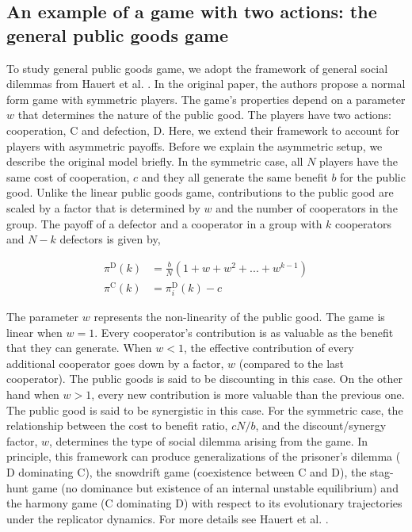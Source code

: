 \documentclass[11pt]{article}
\theoremstyle{plainCl1}
\theoremstyle{plainCl2}
\newcommand{\C}{\mathrm{C}}
\newcommand{\D}{\mathrm{D}}
\begin{document}
\subsection{An example of a  game with two actions: the general public goods game}

To study general public goods game, we adopt the framework of general social dilemmas from Hauert et al. \cite{Hauert:JTB:2006a}. In the original paper, the authors propose a normal form game with symmetric players. The game's properties depend on a parameter $w$ that determines the nature of the public good. The players have two actions: cooperation, $\C$ and defection, $\D$. Here, we extend their framework to account for players with asymmetric payoffs. Before we explain the asymmetric setup, we describe the original model briefly. In the symmetric case, all $N$ players have the same cost of cooperation, $c$ and they all generate the same benefit $b$ for the public good. Unlike the linear public goods game, contributions to the public good are scaled by a factor that is determined by $w$ and the number of cooperators in the group. The payoff of a defector and a cooperator in a group with $k$ cooperators and $N-k$ defectors is given by, 

\begin{align}
\pi^{\D}(k) &= \frac{b}{N}(1 + w + w^2 + ... + w^{k-1}) \\[15pt]
\pi^{\C}(k) &= \pi^{\D}_i(k) - c
\label{Eq:payoff-synergistic-symmetric}
\end{align} 

\noindent The parameter $w$ represents the non-linearity of the public good. The game is linear when $w = 1$. Every cooperator's contribution is as valuable as the benefit that they can generate. When $w < 1$, the effective contribution of every additional cooperator goes down by a factor, $w$ (compared to the last cooperator). The public goods is said to be discounting in this case. On the other hand when $w > 1$, every new contribution is more valuable than the previous one. The public good is said to be synergistic in this case. For the symmetric case, the relationship between the cost to benefit ratio, $cN/b$, and the discount/synergy factor, $w$, determines the type of social dilemma arising from the game. In principle, this framework can produce generalizations of the prisoner's dilemma ($\D$ dominating $\C$), the snowdrift game (coexistence between $\C$ and $\D$), the stag-hunt game (no dominance but existence of an internal unstable equilibrium) and the harmony game ($\C$ dominating $\D$) with respect to its evolutionary trajectories under the replicator dynamics. For more details see Hauert et al. \cite{Hauert:JTB:2006a}. \\ 
\end{document}
